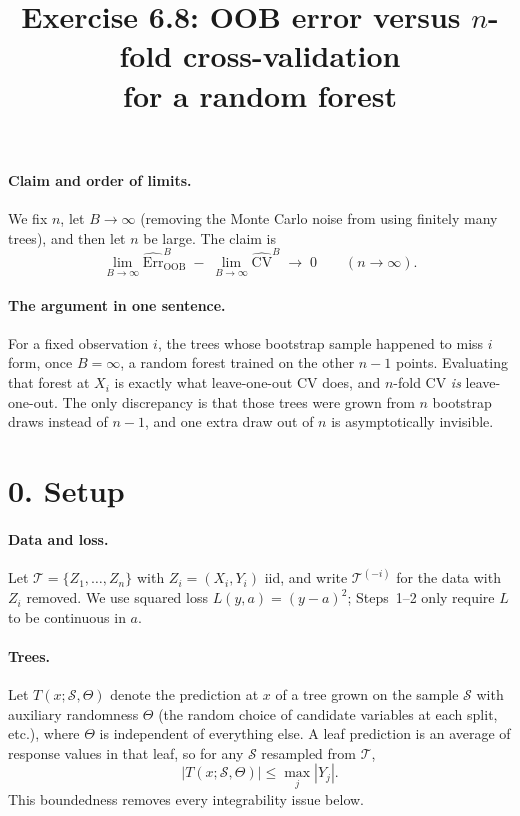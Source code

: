 \documentclass[11pt,a4paper]{article}
\title{Exercise 6.8: OOB error versus $n$-fold cross-validation\\ for a random forest}
\author{}
\date{}
\theoremstyle{remark}
\newcommand{\cT}{\mathcal T}
\newcommand{\cS}{\mathcal S}
\newcommand{\1}{\mathbf 1}
\newcommand{\Err}{\widehat{\mathrm{Err}}}
\newcommand{\CV}{\widehat{\mathrm{CV}}}
\begin{document}
\maketitle

\paragraph{Claim and order of limits.}
We fix $n$, let $B\to\infty$ (removing the Monte Carlo noise from using finitely many trees), and then let $n$ be large. The claim is
\[
\lim_{B\to\infty}\Err^{B}_{\mathrm{OOB}}\;-\;\lim_{B\to\infty}\CV^{B}\;\longrightarrow\;0\qquad(n\to\infty).
\]

\paragraph{The argument in one sentence.}
For a fixed observation $i$, the trees whose bootstrap sample happened to miss $i$ form, once $B=\infty$, a random forest trained on the other $n-1$ points. Evaluating that forest at $X_i$ is exactly what leave-one-out CV does, and $n$-fold CV \emph{is} leave-one-out. The only discrepancy is that those trees were grown from $n$ bootstrap draws instead of $n-1$, and one extra draw out of $n$ is asymptotically invisible.

\section*{0. Setup}

\paragraph{Data and loss.}
Let $\cT=\{Z_1,\dots,Z_n\}$ with $Z_i=(X_i,Y_i)$ iid, and write $\cT^{(-i)}$ for the data with $Z_i$ removed. We use squared loss $L(y,a)=(y-a)^2$; Steps~1--2 only require $L$ to be continuous in $a$.

\paragraph{Trees.}
Let $T(x;\cS,\Theta)$ denote the prediction at $x$ of a tree grown on the sample $\cS$ with auxiliary randomness $\Theta$ (the random choice of candidate variables at each split, etc.), where $\Theta$ is independent of everything else. A leaf prediction is an average of response values in that leaf, so for any $\cS$ resampled from $\cT$,
\begin{equation}\label{eq:bound}
|T(x;\cS,\Theta)|\le \max_{j}|Y_j|.
\end{equation}
This boundedness removes every integrability issue below.
\end{document}

